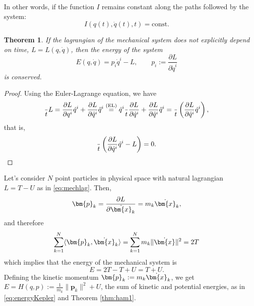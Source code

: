 \documentclass[english,fontsize=11pt,paper=a5,oneside]{scrbook}
\newcommand{\bx}{\bm{x}}
\newcommand{\bp}{\bm{p}}
\newcommand{\lag}{\langle}
\newcommand{\rag}{\rangle}
\let\d\relax
\DeclareMathOperator{\d}{d}
\newtheorem{theorem}{Theorem}[chapter]
\theoremstyle{definition}
\newenvironment{example}
  {\pushQED{\qed}\renewcommand{\qedsymbol}{$\lozenge$}\examplex}
  {\popQED\endexamplex}
\begin{document}
In other words, if the function $I$ remains constant along the paths followed by the system:
\begin{equation}
    I(q(t),\dot q(t), t) = \mathrm{const}.
\end{equation}

\begin{theorem}\label{thm:conservationEnergy}
If the lagrangian of the mechanical system does not explicitly depend on time, $L = L(q, \dot q)$, then the \emph{energy} of the system
\begin{equation}\label{eq:energy1}
    E(q,\dot q) = p_i \dot q^i - L,\qquad p_i := \frac{\partial L}{\partial \dot q^i}
\end{equation}
is conserved.
\end{theorem}
\begin{proof}
    Using the Euler-Lagrange equation, we have
    \begin{equation}
        \frac{\d}{\d t} L
        = \frac{\partial L}{\partial q^i} \dot q^i + \frac{\partial L}{\partial \dot q^i} \ddot q^i
        \overset{\text{(EL)}}{=} \dot q^i \frac{\d}{\d t} \frac{\partial L}{\partial \dot q^i} + \frac{\partial L}{\partial \dot q^i} \ddot q^i
        = \frac{\d}{\d t}\left(\frac{\partial L}{\partial \dot q^i} \dot q^i\right),
    \end{equation}
    that is,
    \begin{equation}
        \frac{\d}{\d t}\left(\frac{\partial L}{\partial \dot q^i} \dot q^i - L\right) = 0.
    \end{equation}
\end{proof}

\begin{example}\label{ex:natlagham}
    Let's consider $N$ point particles in physical space with natural lagrangian $L = T - U$ as in \eqref{eq:mechlag}.
    Then,
    \begin{equation}
        \bp_k = \frac{\partial L}{\partial \dot\bx_k} = m_k \dot \bx_k,
    \end{equation}
    and therefore
    \begin{equation}
        \sum_{k=1}^{N} \lag\bp_k, \dot\bx_k\rag = \sum_{k=1}^{N} m_k \|\dot\bx\|^2 = 2 T
    \end{equation}
    which implies that the energy of the mechanical system is
    \begin{equation}\label{eq:energyFromL}
        E = 2T - T + U = T + U.
    \end{equation}
    Defining the kinetic momentum $\bp_k := m_k \dot \bx_k$, we get $E = H(q,p) := \frac{1}{m_k}\|\bp_k\|^2 + U$, the sum of kinetic and potential energies, as in \eqref{eq:energyKepler} and Theorem \ref{thm:ham1}.
\end{example}
\end{document}
